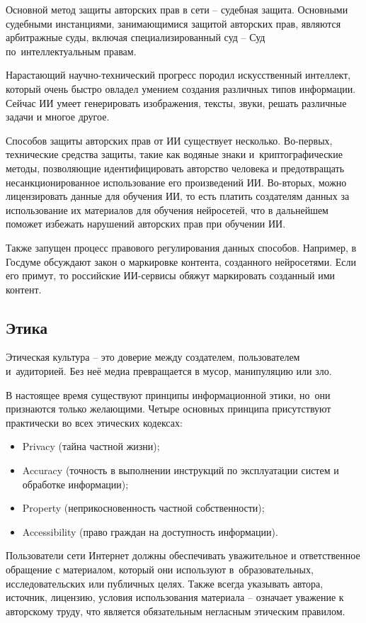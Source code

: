 \documentclass{ou}
\begin{document}
Основной метод защиты авторских прав в сети -- судебная защита. Основными судебными инстанциями, занимающимися защитой авторских прав, являются арбитражные суды, включая специализированный суд -- Суд по~интеллектуальным правам. 

Нарастающий научно-технический прогресс породил искусственный интеллект, который очень быстро овладел умением создания различных типов информации. Сейчас ИИ умеет генерировать изображения, тексты, звуки, решать различные задачи и многое другое.

Способов защиты авторских прав от ИИ существует несколько. Во-первых, технические средства защиты, такие как водяные знаки и~криптографические методы, позволяющие идентифицировать авторство человека и предотвращать несанкционированное использование его произведений ИИ. Во-вторых, можно лицензировать данные для обучения ИИ, то есть платить создателям данных за использование их материалов для обучения нейросетей, что в дальнейшем поможет избежать нарушений авторских прав при обучении ИИ.

Также запущен процесс правового регулирования данных способов. Например, в Госдуме обсуждают закон о маркировке контента, созданного нейросетями. Если его примут, то российские ИИ-сервисы обяжут маркировать созданный ими контент.
\subsection{Этика}
Этическая культура -- это доверие между создателем, пользователем и~аудиторией. Без неё медиа превращается в мусор, манипуляцию или зло.

В настоящее время существуют принципы информационной этики, но~они признаются только желающими. Четыре основных принципа присутствуют практически во всех этических кодексах: 
\begin{itemize}[label=-, leftmargin=0em, itemindent=3.35em, nosep]
\item Privacy (тайна частной жизни); 
\item Accuracy (точность в выполнении инструкций по эксплуатации систем и обработке информации);
\item Property (неприкосновенность частной собственности);
\item Accessibility (право граждан на доступность информации).
\end{itemize}

Пользователи сети Интернет должны обеспечивать уважительное и ответственное обращение с материалом, который они используют в~образовательных, исследовательских или публичных целях. Также всегда указывать автора, источник, лицензию, условия использования материала -- означает уважение к авторскому труду, что является обязательным негласным этическим правилом.
\end{document}
